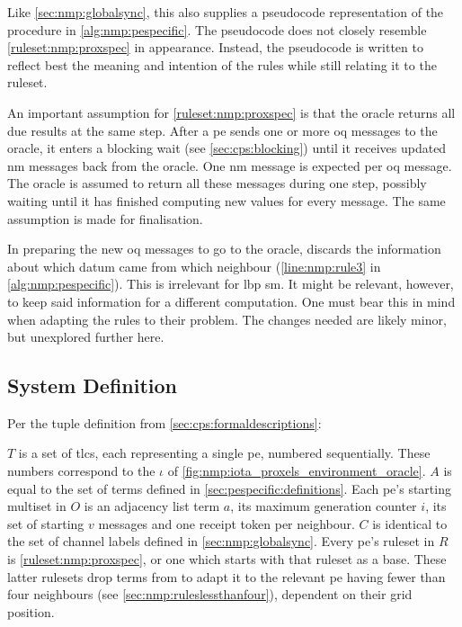 Like \cref{sec:nmp:globalsync}, this  also supplies a pseudocode representation of the procedure in \cref{alg:nmp:pespecific}.  The pseudocode does not closely resemble \cref{ruleset:nmp:proxspec} in appearance.  Instead, the pseudocode is written to reflect best the meaning and intention of the rules while still relating it to the \gls{ruleset}.

An important assumption for \cref{ruleset:nmp:proxspec} is that the oracle returns all due results at the same step.  After a \gls{pe} sends one or more \gls{oq} messages to the oracle, it enters a blocking wait (see \vref{sec:cps:blocking}) until it receives updated \gls{nm} messages back from the oracle.  One \gls{nm} message is expected per \gls{oq} message.  The oracle is assumed to return all these messages during one step, possibly waiting until it has finished computing new values for every message.  The same assumption is made for finalisation.

In preparing the new \gls{oq} messages to go to the oracle,  discards the information about which datum came from which neighbour (\cref{line:nmp:rule3} in \cref{alg:nmp:pespecific}).  This is irrelevant for \gls{lbp} \gls{sm}.  It might be relevant, however, to keep said information for a different computation.  One must bear this in mind when adapting the rules to their problem.  The changes needed are likely minor, but unexplored further here.

\subsection{System Definition}
Per the tuple definition from \cref{sec:cps:formaldescriptions}:


\(T\) is a set of \glspl{tlc}, each representing a single \gls{pe}, numbered sequentially.  These numbers correspond to the \(\iota\) of \cref{fig:nmp:iota_proxels_environment_oracle}.  \(A\) is equal to the set of terms defined in \cref{sec:pespecific:definitions}.  Each \gls{pe}’s starting multiset in \(O\) is an adjacency list term \(a\), its maximum generation counter \(i\), its set of starting \(v\) messages and one receipt token per neighbour.  \(C\) is identical to the set of channel labels defined in \cref{sec:nmp:globalsync}.  Every \gls{pe}'s \gls{ruleset} in \(R\) is \cref{ruleset:nmp:proxspec}, or one which starts with that \gls{ruleset} as a base.  These latter \glspl{ruleset} drop terms from  to adapt it to the relevant \gls{pe} having fewer than four neighbours (see \cref{sec:nmp:ruleslessthanfour}), dependent on their grid position.

